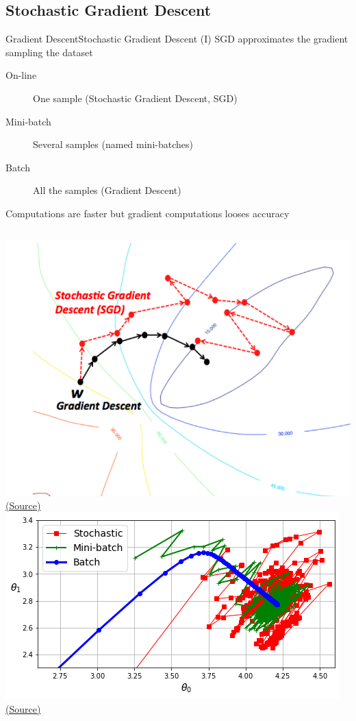 \documentclass[10pt,compress]{beamer} %
\begin{document}
\subsection{Stochastic Gradient Descent}
\begin{frame}{Gradient Descent}{Stochastic Gradient Descent (I)}
	SGD approximates the gradient sampling the dataset
	\begin{description}
		\item[On-line] One sample (Stochastic Gradient Descent, SGD)
		\item[Mini-batch] Several samples (named mini-batches)
		\item[Batch] All the samples (Gradient Descent)
	\end{description}

   	Computations are faster but gradient computations looses accuracy

	\centering

    \begin{columns}
	\centering \includegraphics[width=0.9\linewidth]{figs/sdg.png}\\
	\scriptsize \href{https://wikidocs.net/3413}{(Source)}
	\centering \includegraphics[width=0.9\linewidth]{figs/sgd-comparison.png}\\
	    \scriptsize \href{https://github.com/tuitet/Hands-On-Machine-Learning-with-Scikit-Learn-Keras-and-TensorFlow-3rd-Edition/blob/main/04_training_linear_models.ipynb}{(Source)}
    \end{columns}
\end{frame}
\end{document}
